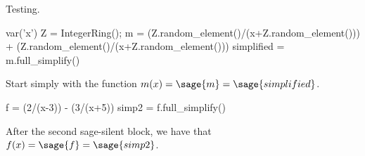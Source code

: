 \documentclass{article}
\begin{document}
Testing.

\begin{sagesilent}
    var('x')
    Z = IntegerRing();
    m = (Z.random_element()/(x+Z.random_element())) + (Z.random_element()/(x+Z.random_element()))
    simplified = m.full_simplify()
\end{sagesilent}

Start simply with the function $m(x) = \sage{m} = \sage{simplified}$.

\begin{sagesilent}
    f = (2/(x-3)) - (3/(x+5))
    simp2 = f.full_simplify()
\end{sagesilent}

After the second sage-silent block, we have that $f(x) = \sage{f} = \sage{simp2}$.
\end{document}
